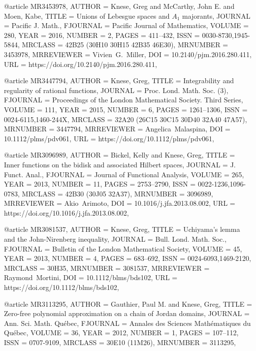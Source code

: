 @article {MR3453978,
    AUTHOR = {Knese, Greg and McCarthy, John E. and Moen, Kabe},
     TITLE = {Unions of {L}ebesgue spaces and {$A_1$} majorants},
   JOURNAL = {Pacific J. Math.},
  FJOURNAL = {Pacific Journal of Mathematics},
    VOLUME = {280},
      YEAR = {2016},
    NUMBER = {2},
     PAGES = {411--432},
      ISSN = {0030-8730,1945-5844},
   MRCLASS = {42B25 (30H10 30H15 42B35 46E30)},
  MRNUMBER = {3453978},
MRREVIEWER = {Vivien\ G.\ Miller},
       DOI = {10.2140/pjm.2016.280.411},
       URL = {https://doi.org/10.2140/pjm.2016.280.411},
}

@article {MR3447794,
    AUTHOR = {Knese, Greg},
     TITLE = {Integrability and regularity of rational functions},
   JOURNAL = {Proc. Lond. Math. Soc. (3)},
  FJOURNAL = {Proceedings of the London Mathematical Society. Third Series},
    VOLUME = {111},
      YEAR = {2015},
    NUMBER = {6},
     PAGES = {1261--1306},
      ISSN = {0024-6115,1460-244X},
   MRCLASS = {32A20 (26C15 30C15 30D40 32A40 47A57)},
  MRNUMBER = {3447794},
MRREVIEWER = {Angelica\ Malaspina},
       DOI = {10.1112/plms/pdv061},
       URL = {https://doi.org/10.1112/plms/pdv061},
}

@article {MR3096989,
    AUTHOR = {Bickel, Kelly and Knese, Greg},
     TITLE = {Inner functions on the bidisk and associated {H}ilbert spaces},
   JOURNAL = {J. Funct. Anal.},
  FJOURNAL = {Journal of Functional Analysis},
    VOLUME = {265},
      YEAR = {2013},
    NUMBER = {11},
     PAGES = {2753--2790},
      ISSN = {0022-1236,1096-0783},
   MRCLASS = {42B30 (30J05 32A37)},
  MRNUMBER = {3096989},
MRREVIEWER = {Akio\ Arimoto},
       DOI = {10.1016/j.jfa.2013.08.002},
       URL = {https://doi.org/10.1016/j.jfa.2013.08.002},
}

@article {MR3081537,
    AUTHOR = {Knese, Greg},
     TITLE = {Uchiyama's lemma and the {J}ohn-{N}irenberg inequality},
   JOURNAL = {Bull. Lond. Math. Soc.},
  FJOURNAL = {Bulletin of the London Mathematical Society},
    VOLUME = {45},
      YEAR = {2013},
    NUMBER = {4},
     PAGES = {683--692},
      ISSN = {0024-6093,1469-2120},
   MRCLASS = {30H35},
  MRNUMBER = {3081537},
MRREVIEWER = {Raymond\ Mortini},
       DOI = {10.1112/blms/bds102},
       URL = {https://doi.org/10.1112/blms/bds102},
}

@article {MR3113295,
    AUTHOR = {Gauthier, Paul M. and Knese, Greg},
     TITLE = {Zero-free polynomial approximation on a chain of {J}ordan
              domains},
   JOURNAL = {Ann. Sci. Math. Qu\'ebec},
  FJOURNAL = {Annales des Sciences Math\'ematiques du Qu\'ebec},
    VOLUME = {36},
      YEAR = {2012},
    NUMBER = {1},
     PAGES = {107--112},
      ISSN = {0707-9109},
   MRCLASS = {30E10 (11M26)},
  MRNUMBER = {3113295},
}

